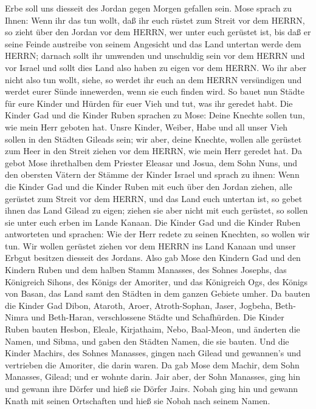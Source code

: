 Erbe soll uns diesseit des Jordan gegen Morgen gefallen sein.
 Mose sprach zu Ihnen: Wenn ihr das tun wollt, daß ihr euch
rüstet zum Streit vor dem HERRN,  so zieht über den Jordan
vor dem HERRN, wer unter euch gerüstet ist, bis daß er seine Feinde
austreibe von seinem Angesicht  und das Land untertan werde
dem HERRN; darnach sollt ihr umwenden und unschuldig sein vor dem HERRN
und vor Israel und sollt dies Land also haben zu eigen vor dem HERRN.
 Wo ihr aber nicht also tun wollt, siehe, so werdet ihr
euch an dem HERRN versündigen und werdet eurer Sünde innewerden, wenn
sie euch finden wird.  So bauet nun Städte für eure Kinder
und Hürden für euer Vieh und tut, was ihr geredet habt. 
Die Kinder Gad und die Kinder Ruben sprachen zu Mose: Deine Knechte
sollen tun, wie mein Herr geboten hat.  Unsre Kinder,
Weiber, Habe und all unser Vieh sollen in den Städten Gileads sein;
 wir aber, deine Knechte, wollen alle gerüstet zum Heer in
den Streit ziehen vor dem HERRN, wie mein Herr geredet hat.
 Da gebot Mose ihrethalben dem Priester Eleasar und Josua,
dem Sohn Nuns, und den obersten Vätern der Stämme der Kinder Israel
 und sprach zu ihnen: Wenn die Kinder Gad und die Kinder
Ruben mit euch über den Jordan ziehen, alle gerüstet zum Streit vor dem
HERRN, und das Land euch untertan ist, so gebet ihnen das Land Gilead zu
eigen;  ziehen sie aber nicht mit euch gerüstet, so sollen
sie unter euch erben im Lande Kanaan.  Die Kinder Gad und
die Kinder Ruben antworteten und sprachen: Wie der Herr redete zu seinen
Knechten, so wollen wir tun.  Wir wollen gerüstet ziehen
vor dem HERRN ins Land Kanaan und unser Erbgut besitzen diesseit des
Jordans.  Also gab Mose den Kindern Gad und den Kindern
Ruben und dem halben Stamm Manasses, des Sohnes Josephs, das Königreich
Sihons, des Königs der Amoriter, und das Königreich Ogs, des Königs von
Basan, das Land samt den Städten in dem ganzen Gebiete umher.
 Da bauten die Kinder Gad Dibon, Ataroth, Aroer,
 Atroth-Sophan, Jaser, Jogbeha,  Beth-Nimra
und Beth-Haran, verschlossene Städte und Schafhürden.  Die
Kinder Ruben bauten Hesbon, Eleale, Kirjathaim,  Nebo,
Baal-Meon, und änderten die Namen, und Sibma, und gaben den Städten
Namen, die sie bauten.  Und die Kinder Machirs, des Sohnes
Manasses, gingen nach Gilead und gewannen's und vertrieben die Amoriter,
die darin waren.  Da gab Mose dem Machir, dem Sohn
Manasses, Gilead; und er wohnte darin.  Jair aber, der Sohn
Manasses, ging hin und gewann ihre Dörfer und hieß sie Dörfer Jairs.
 Nobah ging hin und gewann Knath mit seinen Ortschaften und
hieß sie Nobah nach seinem Namen.

